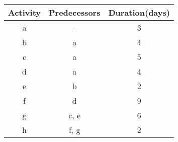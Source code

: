 \begin{tabular}[12pt]{ |c| c| c|}
    \hline
    \textbf{Activity} & \textbf{Predecessors} & \textbf{Duration(days)}\\ 
    \hline
    a & - & 3\\
    \hline 
    b & a & 4\\
    \hline
    c & a & 5\\
    \hline
    d & a & 4\\
    \hline
    e & b & 2\\
    \hline
    f & d & 9\\
    \hline
    g & c, e & 6\\
    \hline
    h & f, g & 2\\
    \hline
    \end{tabular}
